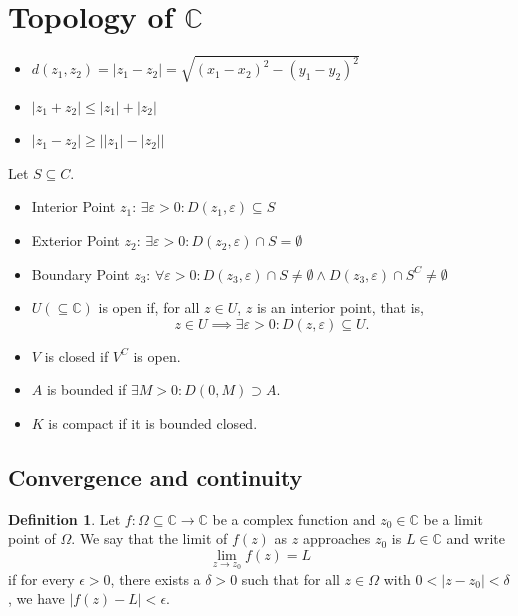 \documentclass[12pt,openany]{book}
\theoremstyle{definition}
\newtheorem{definition}{Definition}[chapter]
\newcommand{\C}{\mathbb{C}}
\newcommand{\abs}[1]{\left\lvert #1 \right\rvert}
\begin{document}
	\newpage
	\section{Topology of $\C$}
	
	\begin{itemize}
		\item $d(z_1,z_2)=\abs{z_1-z_2}=\sqrt{(x_1-x_2)^2-(y_1-y_2)^2}$
		\item $\abs{z_1+z_2}\leq\abs{z_1}+\abs{z_2}$
		\item $\abs{z_1-z_2}\geq\abs{\abs{z_1}-\abs{z_2}}$
	\end{itemize}
	Let $S\subseteq C$.
	\begin{itemize}
		\item Interior Point $z_1$: $\exists\varepsilon>0:D(z_1,\varepsilon)\subseteq S$
		\item Exterior Point $z_2$: $\exists\varepsilon>0:D(z_2,\varepsilon)\cap S=\emptyset$
		\item Boundary Point $z_3$: $\forall\varepsilon>0:D(z_3,\varepsilon)\cap S\neq\emptyset\land D(z_3,\varepsilon)\cap S^C\neq\emptyset$
		\item $U(\subseteq\C)$ is open if, for all $z\in U$, $z$ is an interior point, that is, \[
		z\in U\implies\exists\varepsilon>0:D(z,\varepsilon)\subseteq U.
		\]
		\item $V$ is closed if $V^C$ is open.
		\item $A$ is bounded if $\exists M>0:D(0,M)\supset A$.
		\item $K$ is compact if it is bounded closed.
	\end{itemize}
	
	
	
	\iffalse
	\subsection{Convergence and continuity}
	
	\begin{tcolorbox}[colback=white,colframe=defcolor,arc=5pt,title={\color{white}\bf Limit of Complex function}]
		\begin{definition}
			Let $f: \Omega \subseteq \mathbb{C} \rightarrow \mathbb{C}$ be a complex function and $z_0 \in \mathbb{C}$ be a limit point of $\Omega$. We say that the limit of $f(z)$ as $z$ approaches $z_0$ is $L \in \mathbb{C}$ and write
			\[ \lim_{z \to z_0} f(z) = L \]
			if for every $\epsilon > 0$, there exists a $\delta > 0$ such that for all $z \in \Omega$ with $0 < |z - z_0| < \delta$, we have $|f(z) - L| < \epsilon$.
		\end{definition}
	\end{tcolorbox}
	
\end{document}
